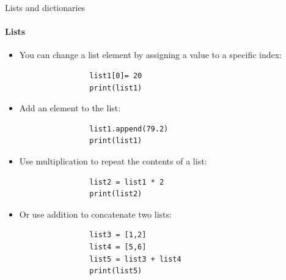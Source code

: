 \documentclass[notes,11pt, aspectratio=169, xcolor=table]{beamer}
\begin{document}
    \begin{frame}[fragile=singleslide]{Lists and dictionaries}
    \framesubtitle{Lists}
    
         \begin{itemize}
            \item You can change a list element by assigning a value to a specific index:

                \begin{verbatim}
                list1[0]= 20 
                print(list1)
                \end{verbatim}    

            \item Add an element to the list:

                \begin{verbatim}
                list1.append(79.2) 
                print(list1)
                \end{verbatim}    

            \item Use multiplication to repeat the contents of a list:

                \begin{verbatim}
                list2 = list1 * 2 
                print(list2)
                \end{verbatim}    

            \item Or use addition to concatenate two lists:

                \begin{verbatim}
                list3 = [1,2]
                list4 = [5,6]
                list5 = list3 + list4
                print(list5)
                \end{verbatim}    

        \end{itemize}       

    \end{frame}
\end{document}
